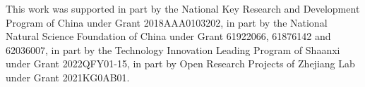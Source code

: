 \begin{acks} 
This work was supported in part by the National Key Research and Development Program of China under Grant 2018AAA0103202, in part by the National Natural Science Foundation of China under Grant 61922066, 61876142 and 62036007, in part by the Technology Innovation Leading Program of Shaanxi under Grant 2022QFY01-15, in part by Open Research Projects of Zhejiang Lab under Grant 2021KG0AB01.
\end{acks}